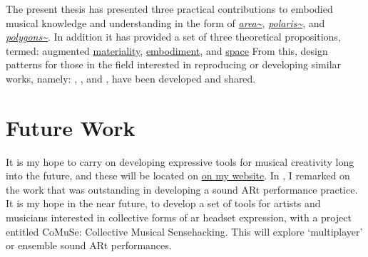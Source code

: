 The present thesis has presented three practical contributions to embodied musical knowledge and understanding in the form of \textit{\hyperref[sec: area]{area\textasciitilde{}}}, \textit{\hyperref[sec: polaris]{polaris\textasciitilde{}}}, and \textit{\hyperref[sec: polygons]{polygons\textasciitilde{}}}. In addition it has provided a set of three theoretical propositions, termed: augmented \hyperref[sec: discussion-medium-material]{materiality}, \hyperref[sec: discussion-medium-embodiment]{embodiment}, and \hyperref[sec: discussion-medium-space]{space} From this, design patterns for those in the field interested in reproducing or developing similar works, namely: \textit{}, \textit{}, and \textit{}, have been developed and shared. 

\section{Future Work}\label{sec: conclusion-futurework}
It is my hope to carry on developing expressive tools for musical creativity long into the future, and these will be located on \href{https://sambilbow.com}{on my website}. In \textit{}, I remarked on the work that was outstanding in developing a sound ARt performance practice. It is my hope in the near future, to develop a set of tools for artists and musicians interested in collective forms of \gls{ar} headset expression, with a project entitled CoMuSe: Collective Musical Sensehacking. This will explore `multiplayer' or ensemble sound ARt performances.
